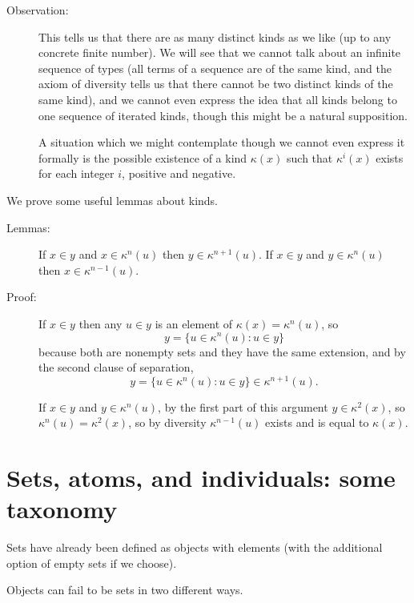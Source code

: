 \documentclass[12pt]{article}
\begin{document}
\begin{description}
\item[Observation:]  This tells us that there are as many distinct kinds as we like (up to any concrete finite number).  We will see that we cannot talk about an infinite sequence of types (all terms of a sequence are of the same kind, and the axiom of diversity tells us that there cannot be two distinct kinds of the same kind), and we cannot even express the idea that all kinds belong to one sequence of iterated kinds, though this might be a natural supposition.

A situation which we might contemplate though we cannot even express it formally is the possible existence of a kind $\kappa(x)$ such that $\kappa^i(x)$ exists for each integer $i$, positive and negative.

\end{description}

We prove some useful lemmas about kinds.

\begin{description}

\item[Lemmas:]  If $x \in y$ and $x \in \kappa^n(u)$ then $y \in \kappa^{n+1}(u)$.  If $x \in y$ and $y \in \kappa^n(u)$ then $x \in \kappa^{n-1}(u)$.

\item[Proof:]  If $x \in y$ then any $u \in y$ is an element of $\kappa(x)=\kappa^n(u)$, so $$y = \{u \in \kappa^n(u):u \in y\}$$ because both are nonempty sets and they have the same extension, and by the second clause of separation, $$y=\{u \in \kappa^n(u):u \in y\} \in \kappa^{n+1}(u).$$

If $x \in y$ and $y \in \kappa^n(u)$, by the first part of this argument $y \in \kappa^2(x)$, so $\kappa^n(u)=\kappa^2(x)$, so by diversity $\kappa^{n-1}(u)$ exists and is equal to $\kappa(x)$.

\newpage



\end{description}

\newpage

\section{Sets, atoms, and individuals: some taxonomy}

Sets have already been defined as objects with elements (with the additional option of empty sets if we choose).

Objects can fail to be sets in two different ways.
\end{document}
